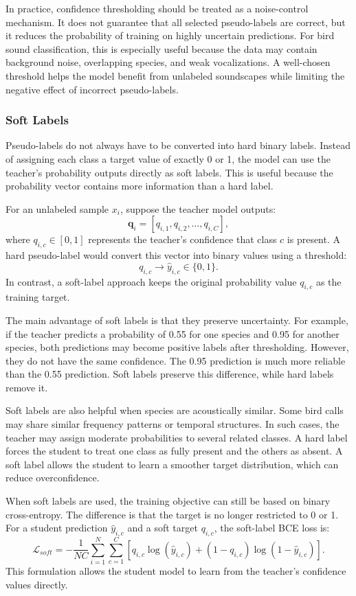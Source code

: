 \documentclass[a4paper,12pt]{article}
\begin{document}
In practice, confidence thresholding should be treated as a noise-control mechanism. It does not guarantee that all selected pseudo-labels are correct, but it reduces the probability of training on highly uncertain predictions. For bird sound classification, this is especially useful because the data may contain background noise, overlapping species, and weak vocalizations. A well-chosen threshold helps the model benefit from unlabeled soundscapes while limiting the negative effect of incorrect pseudo-labels.

\subsubsection{Soft Labels}
Pseudo-labels do not always have to be converted into hard binary labels. Instead of assigning each class a target value of exactly 0 or 1, the model can use the teacher's probability outputs directly as soft labels. This is useful because the probability vector contains more information than a hard label.

For an unlabeled sample $x_i$, suppose the teacher model outputs:
\[
\mathbf{q}_i = [q_{i,1}, q_{i,2}, \ldots, q_{i,C}],
\]
where $q_{i,c} \in [0,1]$ represents the teacher's confidence that class $c$ is present. A hard pseudo-label would convert this vector into binary values using a threshold:
\[
q_{i,c} \rightarrow \hat{y}_{i,c} \in \{0,1\}.
\]
In contrast, a soft-label approach keeps the original probability value $q_{i,c}$ as the training target.

The main advantage of soft labels is that they preserve uncertainty. For example, if the teacher predicts a probability of 0.55 for one species and 0.95 for another species, both predictions may become positive labels after thresholding. However, they do not have the same confidence. The 0.95 prediction is much more reliable than the 0.55 prediction. Soft labels preserve this difference, while hard labels remove it.

Soft labels are also helpful when species are acoustically similar. Some bird calls may share similar frequency patterns or temporal structures. In such cases, the teacher may assign moderate probabilities to several related classes. A hard label forces the student to treat one class as fully present and the others as absent. A soft label allows the student to learn a smoother target distribution, which can reduce overconfidence.

When soft labels are used, the training objective can still be based on binary cross-entropy. The difference is that the target is no longer restricted to 0 or 1. For a student prediction $\hat{y}_{i,c}$ and a soft target $q_{i,c}$, the soft-label BCE loss is:
\[
\mathcal{L}_{soft}
=
-\frac{1}{NC}
\sum_{i=1}^{N}
\sum_{c=1}^{C}
\left[
q_{i,c}\log(\hat{y}_{i,c})
+
(1-q_{i,c})\log(1-\hat{y}_{i,c})
\right].
\]
This formulation allows the student model to learn from the teacher's confidence values directly.
\end{document}
